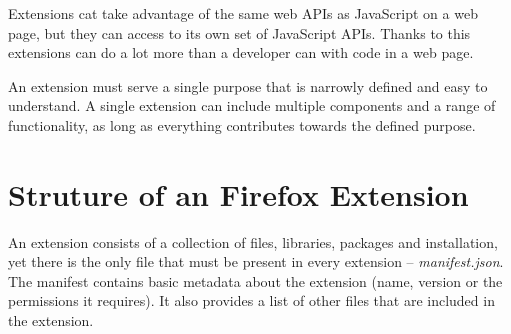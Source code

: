 Extensions cat take advantage of the same web APIs as JavaScript on a web page, but they can access to its own set of JavaScript APIs. Thanks to this extensions can do a lot more than a developer can with code in a web page. \cite{firefoxAboutExtensios}

An extension must serve a single purpose that is narrowly defined and easy to understand. A single extension can include multiple components and a range of functionality, as long as everything contributes towards the defined purpose. \cite{chromeExtensions}

\section{Struture of an Firefox Extension}
An extension consists of a collection of files, libraries, packages and installation, yet there is the only file that must be present in every extension -- \textit{manifest.json}. The manifest contains basic metadata about the extension (name, version or the permissions it requires). It also provides a list of other files that are included in the extension. \cite{extensionAnatomy}

